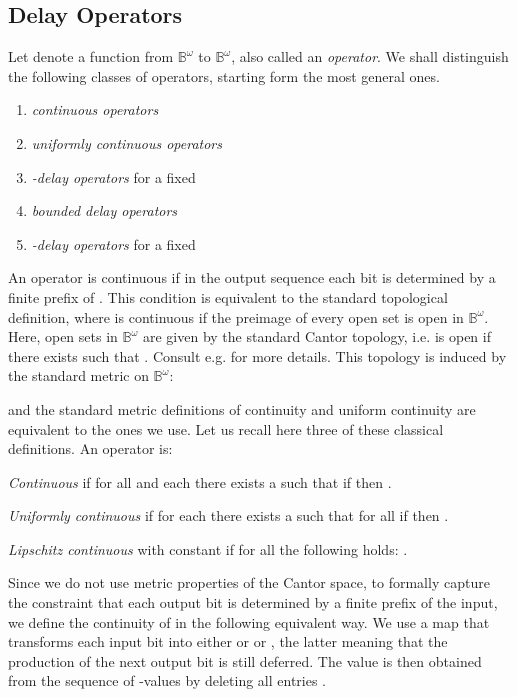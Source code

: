 \documentclass[fleqn,envcountsame]{LMCS}
\newcommand{\Bom}{\ensuremath{\mathbb{B}^{\omega}}\xspace}
\newcommand{\ie}{i.e.\xspace}
\newcommand{\eg}{e.g.\xspace}
\begin{document}
\subsection{Delay Operators}\label{subsec:delay_operators}

Let  denote a function from \Bom to \Bom, also called
an \emph{operator}. We shall distinguish the following classes of operators,
starting form the most general ones.
\begin{enumerate}[(1)]
\item \emph{continuous operators}
\item \emph{uniformly continuous operators}
\item \emph{-delay operators} for a fixed 
\item \emph{bounded delay operators}
\item \emph{-delay operators} for a fixed 
\end{enumerate}

An operator  is continuous if in the output sequence
 each bit is determined by a finite prefix of . 
This condition is equivalent to the standard topological definition,
where  is continuous if the preimage  of every open set
 is open in \Bom. Here, open sets in \Bom are given by
the standard Cantor topology, \ie  is open if there exists
 such that .
Consult \eg \cite{TL93LogSpecInfComp} for more details.
This topology is induced by the standard metric  on \Bom:

and the standard metric definitions of continuity and uniform continuity
are equivalent to the ones we use. Let us recall here three of these classical
definitions. An operator  is: 
\begin{iteMize}{}
\item \emph{Continuous} if for all  and each 
  there exists a  such that if  then 
  .
\item \emph{Uniformly continuous} if for each 
  there exists a  such that for all 
  if  then 
  .
\item \emph{Lipschitz continuous} with constant  if
  for all  the following holds:
  .
\end{iteMize}

\noindent Since we do not use metric properties of the Cantor space,
to formally capture the constraint that each output bit is
determined by a finite prefix of the input, we define
the continuity of  in the following equivalent way.
We use a map  that transforms each input bit into either  or 
or , the latter meaning that the production of the next output bit
is still deferred. The value  is then obtained from the sequence
of -values by deleting all entries .
\end{document}
